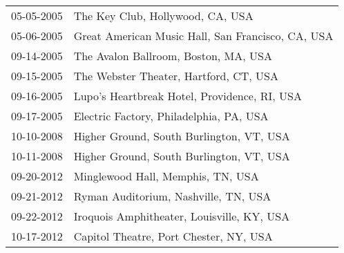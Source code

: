 \begin{supertabular}{ll}
 05-05-2005 &                   The Key Club, Hollywood, CA, USA \\
 05-06-2005 &  Great American Music Hall, San Francisco, CA, USA \\
 09-14-2005 &               The Avalon Ballroom, Boston, MA, USA \\
 09-15-2005 &             The Webster Theater, Hartford, CT, USA \\
 09-16-2005 &       Lupo's Heartbreak Hotel, Providence, RI, USA \\
 09-17-2005 &            Electric Factory, Philadelphia, PA, USA \\
 10-10-2008 &           Higher Ground, South Burlington, VT, USA \\
 10-11-2008 &           Higher Ground, South Burlington, VT, USA \\
 09-20-2012 &                  Minglewood Hall, Memphis, TN, USA \\
 09-21-2012 &               Ryman Auditorium, Nashville, TN, USA \\
 09-22-2012 &         Iroquois Amphitheater, Louisville, KY, USA \\
 10-17-2012 &             Capitol Theatre, Port Chester, NY, USA \\
\end{supertabular}
